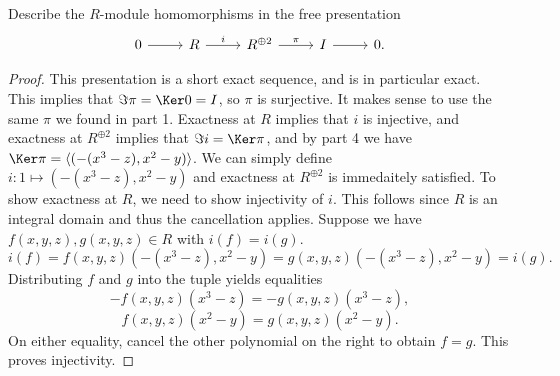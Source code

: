 \documentclass[11pt, letterpaper]{article}
\begin{document}
\begin{problem}
	Describe the $R$-module homomorphisms in the free presentation
	\[\begin{tikzcd}[row sep = 2.5em, column sep = 2.5em]
	0 \ar[r]  & R\ar[" i ", r]  & R^{\oplus 2} \ar[" \pi  ", r]  & I\ar[r]  & 0.
	\end{tikzcd}\]
\end{problem}
\begin{proof}
	This presentation is a short exact sequence, and is in particular exact. This implies that $\Im \pi = \Ker 0 = I$, so $\pi $ is surjective. It makes sense to use the same $\pi $ we found in part 1. Exactness at $R$ implies that $i$ is injective, and exactness at $R^{\oplus 2} $ implies that $\Im i = \Ker \pi $, and by part 4 we have $\Ker \pi =\langle(-(x^3-z),x^2-y)\rangle$. We can simply define $i : 1\mapsto (-(x^3-z),x^2-y)$ and exactness at $R^{\oplus 2} $ is immedaitely satisfied. To show exactness at $R$, we need to show injectivity of $i$. This follows since $R$ is an integral domain and thus the cancellation applies. Suppose we have $f(x,y,z),g(x,y,z)\in R$ with $i(f)=i(g)$.
	\[
		i(f) = f(x,y,z)\left( -(x^3-z),x^2-y \right) = g(x,y,z)\left( -(x^3-z),x^2-y \right) =i(g)
	.\]
	Distributing $f$ and $g$ into the tuple yields equalities
	\[
		-f(x,y,z)\left( x^3-z \right) =-g(x,y,z)\left( x^3-z \right) ,
	\]
	\[
		f(x,y,z)\left( x^2-y \right) =g(x,y,z)\left( x^2-y \right) 
	.\]
	On either equality, cancel the other polynomial on the right to obtain $f=g$. This proves injectivity.
\end{proof}
\end{document}
